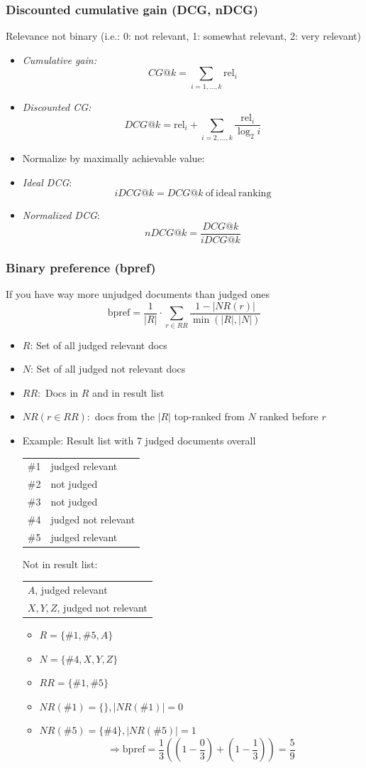 \documentclass[a4paper]{scrartcl}
\begin{document}
\subsubsection{Discounted cumulative gain (DCG, nDCG)}
Relevance not binary (i.e.: 0: not relevant, 1: somewhat relevant, 2: very
relevant)
\begin{itemize}
\item \emph{Cumulative gain:} \[CG@k=\sum_{i=1,...,k} \mathrm{rel}_i\]
\item \emph{Discounted CG:} \[DCG@k = \mathrm{rel}_i +
  \sum_{i=2,...,k}\frac{\mathrm{rel}_i}{\log_2 i}\]
\item Normalize by maximally achievable value:
\item \emph{Ideal DCG}: \[iDCG@k=DCG@k\ \mathrm{of\ ideal\ ranking}\]
\item \emph{Normalized DCG}: \[nDCG@k = \frac{DCG@k}{iDCG@k}\]
\end{itemize}

\subsubsection{Binary preference (bpref)}
If you have way more unjudged documents than judged ones
\[\mathrm{bpref}=\frac{1}{|R|}\cdot\sum_{r\in RR}\frac{1-|NR(r)|}{\min(|R|,|N|)}\]
\begin{itemize}
\item $R$: Set of all judged relevant docs
\item $N$: Set of all judged not relevant docs
\item $RR:$ Docs in $R$ and in result list
\item $NR(r\in RR):$ docs from the $|R|$ top-ranked from $N$ ranked before $r$
\item Example: Result list with 7 judged documents overall\\ 
    \begin{tabular}{ll|}
      \#1&judged relevant\\
      \#2&not judged\\
      \#3&not judged\\
      \#4&judged not relevant\\
      \#5&judged relevant\\
    \end{tabular}
    Not in result list:
    \begin{tabular}{l}
      $A$, judged relevant \\
      $X, Y, Z$, judged not relevant
    \end{tabular}
    \begin{itemize}
    \item $R=\{\#1, \#5, A\} $
    \item $N=\{\#4, X, Y, Z\}$
    \item $RR=\{\#1,\#5\}$
    \item $NR(\#1)= \{\}, |NR(\#1)|=0$
    \item $NR(\#5)= \{\#4\}, |NR(\#5)|=1$
\[\Rightarrow\mathrm{bpref} = \frac{1}{3}\left( \left( 1-\frac{0}{3} \right) +
        \left( 1-\frac{1}{3} \right) \right) = \frac{5}{9}\]
    \end{itemize}
\end{itemize}
\end{document}
